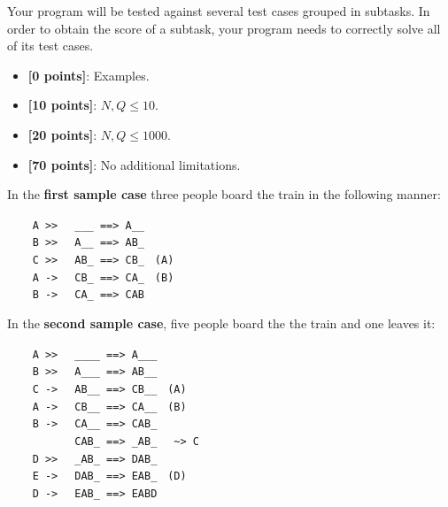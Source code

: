 \Scoring
Your program will be tested against several test cases grouped in subtasks.
In order to obtain the score of a subtask, your program needs to correctly solve all of its test cases.

\begin{itemize}[nolistsep,itemsep=2mm]
  \item \textbf{ [\phantom{1}0 points]}: Examples.
  \item \textbf{ [10 points]}: $N, Q \le 10$.
  \item \textbf{ [20 points]}: $N, Q \le 1000$.
  \item \textbf{ [70 points]}: No additional limitations.
\end{itemize}


\Examples
\begin{example}
%
%
\end{example}

\Explanation
In the \textbf{first sample case} three people board the train in the following manner:

{
\color{gray}  \verb|    A >> |  \color{black}  \verb| ___ ==> A__| \\
\color{gray}  \verb|    B >> |  \color{black}  \verb| A__ ==> AB_| \\
\color{gray}  \verb|    C >> |  \color{black}  \verb| AB_ ==> CB_|  \color{red}  \verb| (A)| \\
\color{gray}  \verb|    A -> |  \color{black}  \verb| CB_ ==> CA_|  \color{red}  \verb| (B)| \\
\color{gray}  \verb|    B -> |  \color{black}  \verb| CA_ ==> CAB| \\
}

In the \textbf{second sample case}, five people board the the train and one leaves it:

{
\color{gray}  \verb|    A >> |  \color{black}  \verb| ____ ==> A___| \\
\color{gray}  \verb|    B >> |  \color{black}  \verb| A___ ==> AB__| \\
\color{gray}  \verb|    C -> |  \color{black}  \verb| AB__ ==> CB__|  \color{red}  \verb| (A)| \\
\color{gray}  \verb|    A -> |  \color{black}  \verb| CB__ ==> CA__|  \color{red}  \verb| (B)| \\
\color{gray}  \verb|    B -> |  \color{black}  \verb| CA__ ==> CAB_| \\
\color{gray}  \verb|         |  \color{black}  \verb| CAB_ ==> _AB_|  \color{gray}  \verb|  ~> C| \\
\color{gray}  \verb|    D >> |  \color{black}  \verb| _AB_ ==> DAB_| \\
\color{gray}  \verb|    E -> |  \color{black}  \verb| DAB_ ==> EAB_|  \color{red}  \verb| (D)| \\
\color{gray}  \verb|    D -> |  \color{black}  \verb| EAB_ ==> EABD| \\
}
